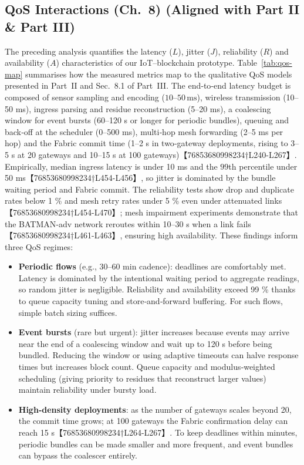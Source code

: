 \subsection{QoS Interactions (Ch.~8) (Aligned with Part II \& Part III)}
\label{subsec:qos-interactions}

The preceding analysis quantifies the latency (\(L\)), jitter (\(J\)), reliability (\(R\)) and availability (\(A\)) characteristics of our IoT–blockchain prototype.  Table~\ref{tab:qos-map} summarises how the measured metrics map to the qualitative QoS models presented in Part~II and Sec.~8.1 of Part~III.  The end‑to‑end latency budget is composed of sensor sampling and encoding (\(10\)–\(50\,\text{ms}\)), wireless transmission (10–50 ms), ingress parsing and residue reconstruction (5–20 ms), a coalescing window for event bursts (60–120 s or longer for periodic bundles), queuing and back‑off at the scheduler (0–500 ms), multi‑hop mesh forwarding (2–5 ms per hop) and the Fabric commit time (1–2 s in two‑gateway deployments, rising to 3–5 s at 20 gateways and 10–15 s at 100 gateways)【76853680998234†L240-L267】.  Empirically, median ingress latency is under 10 ms and the \(99\)th percentile under 50 ms【76853680998234†L454-L456】, so jitter is dominated by the bundle waiting period and Fabric commit.  The reliability tests show drop and duplicate rates below 1 \% and mesh retry rates under 5 \% even under attenuated links【76853680998234†L454-L470】; mesh impairment experiments demonstrate that the BATMAN‑adv network reroutes within 10–30 s when a link fails【76853680998234†L461-L463】, ensuring high availability.  These findings inform three QoS regimes:
\begin{itemize}
  \item \textbf{Periodic flows} (e.g., 30–60 min cadence): deadlines are comfortably met.  Latency is dominated by the intentional waiting period to aggregate readings, so random jitter is negligible.  Reliability and availability exceed 99 \% thanks to queue capacity tuning and store‑and‑forward buffering.  For such flows, simple batch sizing suffices.
  \item \textbf{Event bursts} (rare but urgent): jitter increases because events may arrive near the end of a coalescing window and wait up to 120 s before being bundled.  Reducing the window or using adaptive timeouts can halve response times but increases block count.  Queue capacity and modulus‑weighted scheduling (giving priority to residues that reconstruct larger values) maintain reliability under bursty load.
  \item \textbf{High‑density deployments}: as the number of gateways scales beyond 20, the commit time grows; at 100 gateways the Fabric confirmation delay can reach 15 s【76853680998234†L264-L267】.  To keep deadlines within minutes, periodic bundles can be made smaller and more frequent, and event bundles can bypass the coalescer entirely.
\end{itemize}

